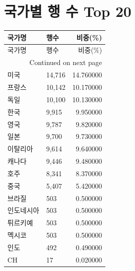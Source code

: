 \documentclass[11pt,a4paper]{article}
\begin{document}
\section{국가별 행 수 Top 20}
\begin{longtable}{llr}
\toprule
국가명 & 행수 & 비중(\%) \\
\midrule
\endfirsthead
\toprule
국가명 & 행수 & 비중(\%) \\
\midrule
\endhead
\midrule
\multicolumn{3}{r}{Continued on next page} \\
\midrule
\endfoot
\bottomrule
\endlastfoot
미국 & 14,716 & 14.760000 \\
프랑스 & 10,142 & 10.170000 \\
독일 & 10,100 & 10.130000 \\
한국 & 9,915 & 9.950000 \\
영국 & 9,787 & 9.820000 \\
일본 & 9,700 & 9.730000 \\
이탈리아 & 9,614 & 9.640000 \\
캐나다 & 9,446 & 9.480000 \\
호주 & 8,341 & 8.370000 \\
중국 & 5,407 & 5.420000 \\
브라질 & 503 & 0.500000 \\
인도네시아 & 503 & 0.500000 \\
튀르키예 & 503 & 0.500000 \\
멕시코 & 503 & 0.500000 \\
인도 & 492 & 0.490000 \\
CH & 17 & 0.020000 \\
\end{longtable}
\end{document}
